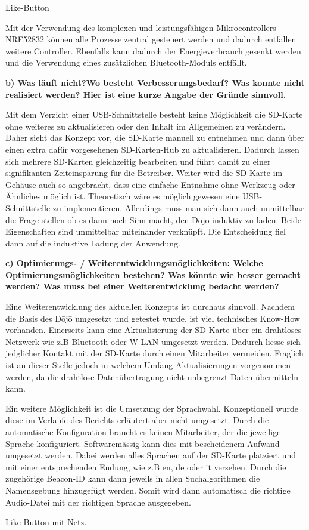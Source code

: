 Like-Button

Mit der Verwendung des komplexen und leistungsfähigen Mikrocontrollers NRF52832 können alle Prozesse zentral gesteuert werden und dadurch entfallen weitere Controller. Ebenfalls kann dadurch der Energieverbrauch gesenkt werden und die Verwendung eines zusätzlichen Bluetooth-Moduls entfällt.

\textbf{b) Was läuft nicht?Wo besteht Verbesserungsbedarf? Was konnte nicht realisiert werden? Hier ist eine kurze Angabe der Gründe sinnvoll.}

Mit dem Verzicht einer USB-Schnittstelle besteht keine Möglichkeit die SD-Karte ohne weiteres zu aktualisieren oder den Inhalt im Allgemeinen zu verändern. Daher sieht das Konzept vor, die SD-Karte manuell zu entnehmen und dann über einen extra dafür vorgesehenen SD-Karten-Hub zu aktualisieren. Dadurch lassen sich mehrere SD-Karten gleichzeitig bearbeiten und führt damit zu einer signifikanten Zeiteinsparung für die Betreiber. Weiter wird die SD-Karte im Gehäuse auch so angebracht, dass eine einfache Entnahme ohne Werkzeug oder Ähnliches möglich ist. Theoretisch wäre es möglich gewesen eine USB-Schnittstelle zu implementieren. Allerdings muss man sich dann auch unmittelbar die Frage stellen ob es dann noch Sinn macht, den Dōjō induktiv zu laden. Beide Eigenschaften sind unmittelbar miteinander verknüpft. Die Entscheidung fiel dann auf die induktive Ladung der Anwendung.

\textbf{c) Optimierungs- / Weiterentwicklungsmöglichkeiten: Welche Optimierungsmöglichkeiten bestehen? Was könnte wie besser gemacht werden? Was muss bei einer Weiterentwicklung bedacht werden?
}

Eine Weiterentwicklung des aktuellen Konzepts ist durchaus sinnvoll. Nachdem die Basis des Dōjō umgesetzt und getestet wurde, ist viel technisches \glqq Know-How \grqq vorhanden. Einerseits kann eine Aktualisierung der SD-Karte über ein drahtloses Netzwerk wie z.B Bluetooth oder W-LAN umgesetzt werden. Dadurch liesse sich jedglicher Kontakt mit der SD-Karte durch einen Mitarbeiter vermeiden. Fraglich ist an dieser Stelle jedoch in welchem Umfang Aktualisierungen vorgenommen werden, da die drahtlose Datenübertragung nicht unbegrenzt Daten übermitteln kann.

Ein weitere Möglichkeit ist die Umsetzung der Sprachwahl. Konzeptionell wurde diese im Verlaufe des Berichts erläutert aber nicht umgesetzt. Durch die automatische Konfiguration braucht es keinen Mitarbeiter, der die jeweilige Sprache konfiguriert. Softwaremässig kann dies mit bescheidenem Aufwand umgesetzt werden. Dabei werden alles Sprachen auf der SD-Karte platziert und mit einer entsprechenden Endung, wie z.B en, de oder it versehen. Durch die zugehörige Beacon-ID kann dann jeweils in allen Suchalgorithmen die Namensgebung hinzugefügt werden. Somit wird dann automatisch die richtige Audio-Datei mit der richtigen Sprache ausgegeben.

Like Button mit Netz.